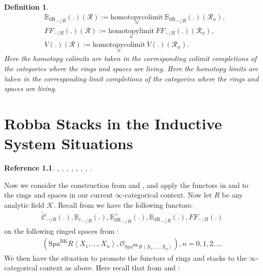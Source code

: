 \documentclass[12pt]{book}
\newtheorem{definition}{Definition}
\newtheorem{reference}{Reference}
\begin{document}
\begin{definition}
\begin{align}
&{\mathbb{B}_\mathrm{dR}}_{-/R}(.)(\mathcal{R}):=\underset{n}{\mathrm{homotopycolimit}}~{\mathbb{B}_\mathrm{dR}}_{-/R}(.)(\mathcal{R}_n),\\
&{{FF}}_{-/R}(.)(\mathcal{R}):=\underset{n}{\mathrm{homotopylimit}}~{{FF}}_{-/R}(.)(\mathcal{R}_n),\\	
&V(.)(\mathcal{R}):=\underset{n}{\mathrm{homotopycolimit}}~V(.)(\mathcal{R}_n).
\end{align}
Here the homotopy colimits are taken in the corresponding colimit completions of the categories where the rings and spaces are living. Here the homotopy limits are taken in the corresponding limit completions of the categories where the rings and spaces are living.
\end{definition}











\chapter{Robba Stacks in the Inductive System Situations}


\begin{reference}
\cite{KL1}, \cite{KL2}, \cite{Sch1}, \cite{Sch}, \cite{Fon}, \cite{FF}, \cite{F1}, \cite{Ta}.
\end{reference}


Now we consider the construction from \cite[Definition 9.3.3, Definition 9.3.5, Definition 9.3.11, Definition 9.3.9]{KL1} and \cite{KL2}, and apply the functors in \cite[Definition 9.3.3, Definition 9.3.5, Definition 9.3.11, Definition 9.3.9]{KL1} and \cite{KL2} to the rings and spaces in our current $\infty$-categorical context. Now let $R$ be any analytic field $\mathcal{K}$. Recall from \cite[Definition 9.3.3, Definition 9.3.5, Definition 9.3.11, Definition 9.3.9]{KL1} we have the following functors:
\begin{align}
\widetilde{\mathcal{C}}_{-/R}(.),{\mathbb{B}_e}_{-/R}(.),{\mathbb{B}_\mathrm{dR}^+}_{-/R}(.),{\mathbb{B}_\mathrm{dR}}_{-/R}(.),{FF}_{-/R}(.)	
\end{align}
on the following ringed spaces from \cite{BK}:
\begin{align}
(\mathrm{Spa}^\mathrm{BK}R\left<X_1,...,X_n\right>,\mathcal{O}_{\mathrm{Spa}^\mathrm{BK}R\left<X_1,...,X_n\right>}),n=0,1,2,...	
\end{align}
We then have the situation to promote the functors of rings and stacks to the $\infty$-categorical context as above. Here recall that from \cite[Definition 9.3.3, Definition 9.3.5, Definition 9.3.11, Definition 9.3.9]{KL1} and \cite{KL2}:
\end{document}
